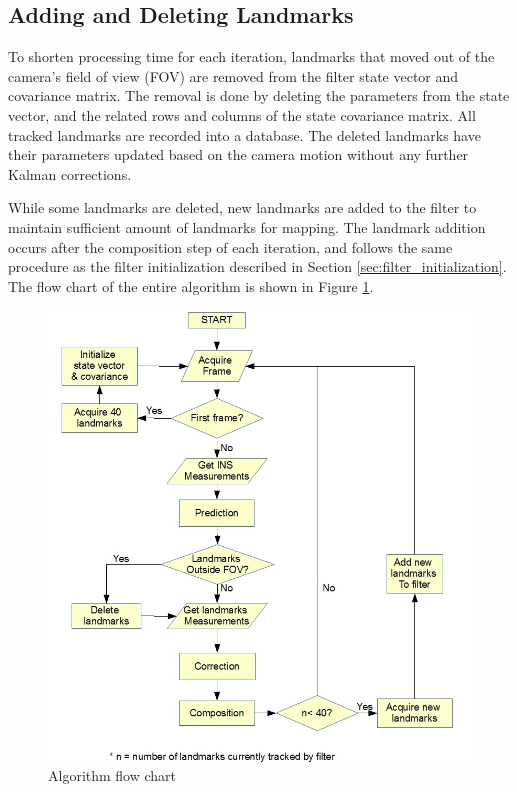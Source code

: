 \subsection{Adding and Deleting Landmarks}
To shorten processing time for each iteration, landmarks that moved
out of the camera's field of view (FOV) are removed from the filter
state vector and covariance matrix. The removal is done by deleting
the parameters from the state vector, and the related rows and columns
of the state covariance matrix. All tracked landmarks are recorded
into a database. The deleted landmarks have their parameters updated
based on the camera motion without any further Kalman corrections.

While some landmarks are deleted, new landmarks are added to the
filter to maintain sufficient amount of landmarks for mapping. The
landmark addition occurs after the composition step of each
iteration, and follows the same procedure as the filter
initialization described in Section \ref{sec:filter_initialization}.
The flow chart of the entire algorithm is shown in Figure
\ref{fig:flowchart}.

\begin{figure}[h]
\centering
\includegraphics[width=14cm, keepaspectratio=true]{./Figures/flow_chart.jpg}
\caption{Algorithm flow chart}
\label{fig:flowchart}
\end{figure}
\FloatBarrier

